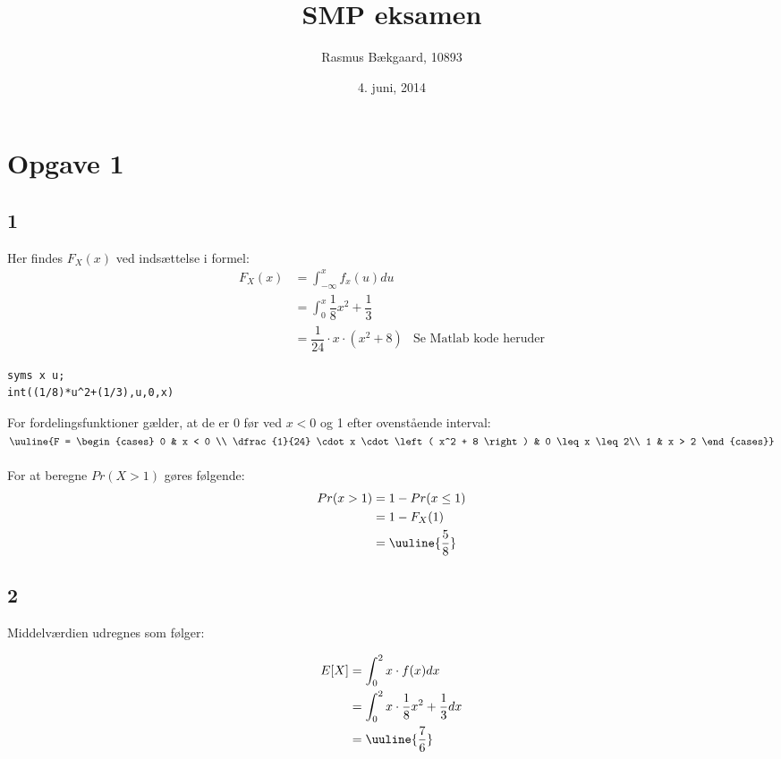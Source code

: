 \documentclass{article}
\title{SMP eksamen}
\date{4. juni, 2014}
\author{Rasmus Bækgaard, 10893}
\begin{document}
\maketitle

\section*{Opgave 1} %
\label{sec:section_name}

\subsection*{1} %
\label{sub:1}

Her findes $F_X(x)$ ved indsættelse i formel:
\begin{align}
F_X(x) &= \int_{-\infty}^x f_x(u) du \\
	&= \int_0^x \dfrac{1}{8} x^2 + \dfrac{1}{3} \\
	&= \dfrac{1}{24} \cdot x \cdot \left( x^2 + 8 \right) & \text{Se Matlab kode heruder}
\end{align}

\begin{lstlisting}[caption=Opgave 1 del 1, style=Code-Matlab, label=lst:opg11]
syms x u;
int((1/8)*u^2+(1/3),u,0,x)
\end{lstlisting}

For fordelingsfunktioner gælder, at de er 0 før ved $x < 0$ og 1 efter ovenstående interval: \\
$\uuline{F = 
\begin{cases}
0 & x < 0 \\
\dfrac{1}{24} \cdot x \cdot \left( x^2 + 8 \right) & 0 \leq x \leq 2\\
1 & x > 2
\end{cases}}$
\\
\\
For at beregne $Pr(X > 1)$ gøres følgende: 
\begin{align}
Pr(x > 1) &= 1- Pr(x \leq 1) \\
	&= 1- F_X(1) \\
	&= \uuline{\dfrac{5}{8}}
\end{align}


\subsection*{2} %

Middelværdien udregnes som følger:

\begin{align}
E[X] &= \int_0^2 x \cdot f(x) dx \\
	&= \int_0^2 x \cdot \dfrac{1}{8} x^2 + \dfrac{1}{3} dx \\
	&= \uuline{\dfrac{7}{6}}
\end{align}
\end{document}
